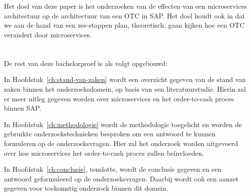 \section{}
\label{sec:onderzoeksdoelstelling}
Het doel van deze paper is het onderzoeken van de effecten van een microservices architectuur op de architectuur van een OTC in SAP. Het doel houdt ook in dat we aan de hand van een zes-stappen plan, theoretisch, gaan kijken hoe een OTC verandert door microservices.  

\section{}
\label{sec:opzet-bachelorproef}


De rest van deze bachelorproef is als volgt opgebouwd:

In Hoofdstuk~\ref{ch:stand-van-zaken} wordt een overzicht gegeven van de stand van zaken binnen het onderzoeksdomein, op basis van een literatuurstudie. Hierin zal er meer uitleg gegeven worden over microservices en het order-to-cash proces binnen SAP.

In Hoofdstuk~\ref{ch:methodologie} wordt de methodologie toegelicht en worden de gebruikte onderzoekstechnieken besproken om een antwoord te kunnen formuleren op de onderzoeksvragen. Hier zal het onderzoek worden uitgevoerd over hoe microservices het order-to-cash proces zullen beïnvloeden.


In Hoofdstuk~\ref{ch:conclusie}, tenslotte, wordt de conclusie gegeven en een antwoord geformuleerd op de onderzoeksvragen. Daarbij wordt ook een aanzet gegeven voor toekomstig onderzoek binnen dit domein.
